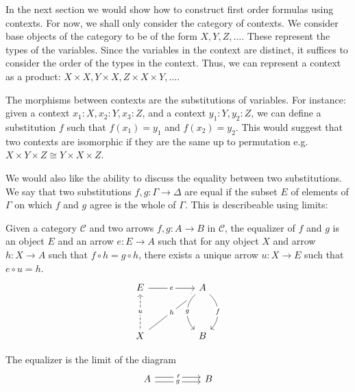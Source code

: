 In the next section we would show how to construct first order formulas 
using contexts. For now, we shall only consider the category of contexts.
We consider base objects of the category to be of the form $X,Y,Z,\dots$.
These represent the types of the variables.
Since the variables in the context are distinct, it suffices to 
consider the order of the types in the context. Thus, we can represent a context
as a product: $X\times X,Y\times X,Z\times X\times Y,\dots$.

The morphisms between contexts are the substitutions of variables.
For instance: given a context $x_1:X,x_2:Y,x_3:Z$,
and a context $y_1:Y,y_2:Z$,
we can define a substitution $f$ such that $f(x_1)=y_1$ and $f(x_2)=y_2$.
This would suggest that two contexts are isomorphic if they are the same
up to permutation e.g. $X\times Y\times Z\cong Y\times X\times Z$.

We would also like the ability to discuss the equality between two substitutions.
We say that two substitutions $f,g:\Gamma\to\Delta$ are equal if 
the subset $E$ of elements of $\Gamma$ on which $f$ and $g$ agree is the whole of $\Gamma$.
This is describeable using limits:
\begin{definition}[Equalizer]
    Given a category $\mathcal{C}$ and two arrows $f,g:A\to B$ in $\mathcal{C}$,
    the equalizer of $f$ and $g$ is an object $E$ and an arrow $e:E\to A$ such that
    for any object $X$ and arrow $h:X\to A$ such that $f\circ h=g\circ h$,
    there exists a unique arrow $u:X\to E$ such that $e\circ u=h$.
    \[\begin{tikzcd}
        E && A \\
        \\
        X && B
        \arrow["e"{description}, from=1-1, to=1-3]
        \arrow["h"{description}, from=3-1, to=1-3]
        \arrow["u"{description}, dashed, from=3-1, to=1-1]
        \arrow[""{name=0, anchor=center, inner sep=0}, "{f}"{description}, from=1-3, to=3-3, bend left=49, crossing over]
        \arrow[""{name=1, anchor=center, inner sep=0}, "{g}"{description}, from=1-3, to=3-3, bend right=49, crossing over]
    \end{tikzcd}\]
\end{definition}
The equalizer is the limit of the diagram
\[\begin{tikzcd}
    A && B
    \arrow["f"{description}, from=1-1, to=1-3, shift left=1]
    \arrow["g"{description}, from=1-1, to=1-3, shift right=1]
\end{tikzcd}\]

